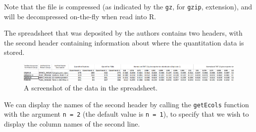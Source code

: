 Note that the file is compressed (as indicated by the \texttt{gz}, for
\texttt{gzip}, extension), and will be decompressed on-the-fly when
read into R.

The spreadsheet that was deposited by the authors contains two
headers, with the second header containing information about where the
quantitation data is stored. 

\begin{figure}[!ht]
  \centering
  \includegraphics[width=.65\textwidth]{./Figures/spreadsheet-screenshot.png}
  \caption{A screenshot of the data in the spreadsheet.}
  \label{fig:spreadsheet}
\end{figure}


We can display the names of the second header by calling the
\texttt{getEcols} function with the argument \texttt{n = 2} (the default value is \texttt{n
= 1}), to specify that we wish to display the column names of the
second line.



